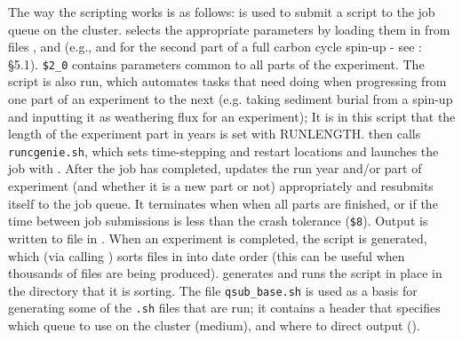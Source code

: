 \documentclass[10pt,a4paper, onecolumn]{article}
\begin{document}
\begin{enumerate}
The way the scripting works is as follows: \texttt{} is used to submit a script \texttt{} to the job queue on the cluster. \texttt{} selects the appropriate parameters by loading them in from files \texttt{}, \texttt{} and \texttt{} (e.g.\texttt{}, \texttt{} and \texttt{} for the second part of a full carbon cycle spin-up - see \texttt{}: \S5.1). \texttt{\$2\_0} contains parameters common to all parts of the experiment. The script \texttt{} is also run, which automates tasks that need doing when progressing from one part of an experiment to the next (e.g. taking sediment burial from a spin-up and inputting it as weathering flux for an experiment); It is in this script that the length of the experiment part in years is set with RUNLENGTH. \texttt{} then calls \texttt{runcgenie.sh}, which sets time-stepping and restart locations and launches the job with \texttt{}. After the job has completed, \texttt{} updates the run year and/or part of experiment (and whether it is a new part or not) appropriately and resubmits itself to the job queue. It terminates when when all parts are finished, or if the time between job submissions is less than the crash tolerance (\texttt{\$8}). Output is written to file in \texttt{}. When an experiment is completed, the script \texttt{} is generated, which (via calling \texttt{}) sorts files in \texttt{} into date order (this can be useful when thousands of files are being produced). \texttt{} generates and runs the script \texttt{} in place in the directory that it is sorting. The file \texttt{qsub\_base.sh} is used as a basis for generating some of the \texttt{.sh} files that are run; it contains a header that specifies which queue to use on the cluster (medium), and where to direct output (\texttt{}).


\end{enumerate}
\end{document}
